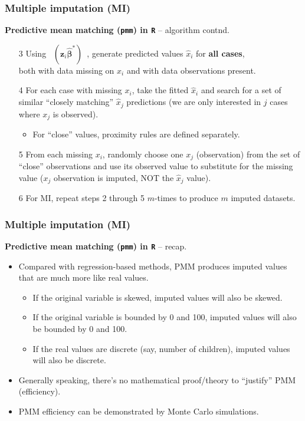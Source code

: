 \documentclass{beamer}
\begin{document}
\begin{frame}
\frametitle{Multiple imputation (MI)}
\textbf{Predictive mean matching (\texttt{pmm}) in \texttt{R}} -- algorithm contnd.\\
\bigskip
\begin{enumerate}
    \item[3] Using ~$(\bm{z}_i \hat{\bm{\beta}}^{\ast})$~, generate predicted values $\hat{x}_i$ for \textbf{all cases}, \\both with data missing on $x_i$ and with data observations present.
    \medskip
    \item[4] For each case with missing $x_i$, take the fitted $\hat{x}_i$ and search for a set of similar ``closely matching'' $\hat{x}_j$ predictions (we are only interested in $j$ cases where $x_j$ is observed).
    \medskip
    \begin{itemize}
        \item For ``close'' values, proximity rules are defined separately.
    \end{itemize}
    \medskip
    \item[5] From each missing $x_i$, randomly choose one $x_j$ (observation) from the set of ``close'' observations and use its observed value to substitute for the missing value ($x_j$ observation is imputed, NOT the $\hat{x}_j$ value).
    \medskip
    \item[6] For MI, repeat steps 2 through 5 $m$-times to produce $m$ imputed datasets.  
\end{enumerate}
\end{frame}
\begin{frame}
\frametitle{Multiple imputation (MI)}
\textbf{Predictive mean matching (\texttt{pmm}) in \texttt{R}} -- recap.\\
\medskip
\begin{itemize}
    \item Compared with regression-based methods, PMM produces imputed values that are much more like real values. 
    \smallskip
    \begin{itemize}
        \item If the original variable is skewed, imputed values will also be skewed.
        \smallskip
        \item If the original variable is bounded by 0 and 100, imputed values will also be bounded by 0 and 100.
        \smallskip
        \item If the real values are discrete (say, number of children), imputed values will also be discrete. 
    \end{itemize} 
    \smallskip
    \item Generally speaking,  there’s no mathematical proof/theory to ``justify'' PMM (efficiency).
    \smallskip
    \item PMM efficiency can be demonstrated by Monte Carlo simulations.
\end{itemize}
\end{frame}
\end{document}
